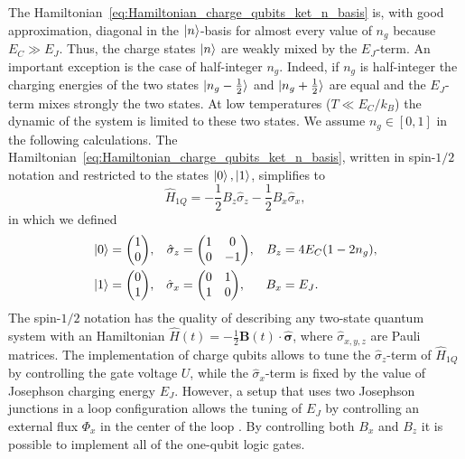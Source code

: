 \documentclass[../main/main.tex]{subfiles}
\begin{document}
The Hamiltonian~\eqref{eq:Hamiltonian_charge_qubits_ket_n_basis} is, with good approximation, diagonal in the $\ket{n}$-basis for almost every value of $n_g$ because $E_C \gg E_J$. Thus, the charge states $\ket{n}$ are weakly mixed by the $E_J$-term. An important exception is the case of half-integer $n_g$. Indeed, if $n_g$ is half-integer the charging energies of the two states $\ket{n_g-\frac{1}{2}}$ and $\ket{n_g+\frac{1}{2}}$ are equal and the $E_J$-term mixes strongly the two states. At low temperatures ($T \ll E_C/k_B$) the dynamic of the system is limited to these two states. We assume $n_g \in [0,1]$ in the following calculations. The Hamiltonian~\eqref{eq:Hamiltonian_charge_qubits_ket_n_basis}, written in spin-$1/2$ notation and restricted to the states $\ket{0},\ket{1}$, simplifies to
\begin{equation} \label{eq:Hamiltonian_charge_qubits_halfspin}
    \hat{H}_{1Q} = -\frac{1}{2} B_z \hat{\sigma}_z -\frac{1}{2} B_x \hat{\sigma}_x,
\end{equation}
in which we defined
\begin{align} \label{eq:matrices_definition}
    \ket{0} &= 
    {\begin{pmatrix}
    1 \\ 0
    \end{pmatrix}},
    &
    \hat{\sigma}_z &= 
    {\begin{pmatrix}
    1 & 0 \\ 0 & -1
    \end{pmatrix}},
    &
    B_z &= 4 E_C (1 - 2 n_g),
    \\
    \ket{1} &= 
    {\begin{pmatrix}
    0 \\ 1
    \end{pmatrix}},
    &
    \hat{\sigma}_x &= 
    {\begin{pmatrix}
    0 & 1 \\ 1 & 0
    \end{pmatrix}},
    &
    B_x &= E_J.
    \nonumber
\end{align}
The spin-$1/2$ notation has the quality of describing any two-state quantum system with an Hamiltonian $\hat{H}(t)=-\frac{1}{2} \boldsymbol{B}(t) \cdot \boldsymbol{\hat{\sigma}}$, where $\hat{\sigma}_{x,y,z}$ are Pauli matrices. The implementation of charge qubits allows to tune the $\hat{\sigma}_z$-term of $\hat{H}_{1Q}$ by controlling the gate voltage $U$, while the $\hat{\sigma}_x$-term is fixed by the value of Josephson charging energy $E_J$. However, a setup that uses two Josephson junctions in a loop configuration allows the tuning of $E_J$ by controlling an external flux $\Phi_x$ in the center of the loop \cite[Sect.~IIB]{RevModPhys.73.357}. By controlling both $B_x$ and $B_z$ it is possible to implement all of the one-qubit logic gates. \par
\end{document}
